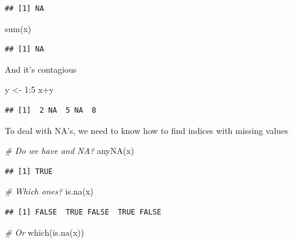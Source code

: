 \documentclass[
]{book}
\newenvironment{Shaded}{\begin{snugshade}}{\end{snugshade}}
\newcommand{\CommentTok}[1]{\textcolor[rgb]{0.56,0.35,0.01}{\textit{#1}}}
\newcommand{\DecValTok}[1]{\textcolor[rgb]{0.00,0.00,0.81}{#1}}
\newcommand{\FunctionTok}[1]{\textcolor[rgb]{0.00,0.00,0.00}{#1}}
\newcommand{\NormalTok}[1]{#1}
\newcommand{\OtherTok}[1]{\textcolor[rgb]{0.56,0.35,0.01}{#1}}
\newcommand{\SpecialCharTok}[1]{\textcolor[rgb]{0.00,0.00,0.00}{#1}}
\theoremstyle{definition}
\theoremstyle{definition}
\theoremstyle{definition}
\theoremstyle{definition}
\theoremstyle{remark}
\begin{document}
\begin{verbatim}
## [1] NA
\end{verbatim}

\begin{Shaded}
\begin{Highlighting}[]
\FunctionTok{sum}\NormalTok{(x)}
\end{Highlighting}
\end{Shaded}

\begin{verbatim}
## [1] NA
\end{verbatim}

And it's contagious

\begin{Shaded}
\begin{Highlighting}[]
\NormalTok{y }\OtherTok{\textless{}{-}} \DecValTok{1}\SpecialCharTok{:}\DecValTok{5}
\NormalTok{x}\SpecialCharTok{+}\NormalTok{y}
\end{Highlighting}
\end{Shaded}

\begin{verbatim}
## [1]  2 NA  5 NA  8
\end{verbatim}

To deal with NA's, we need to know how to find indices with missing values

\begin{Shaded}
\begin{Highlighting}[]
\CommentTok{\# Do we have and NA?}
\FunctionTok{anyNA}\NormalTok{(x)}
\end{Highlighting}
\end{Shaded}

\begin{verbatim}
## [1] TRUE
\end{verbatim}

\begin{Shaded}
\begin{Highlighting}[]
\CommentTok{\# Which ones?}
\FunctionTok{is.na}\NormalTok{(x)}
\end{Highlighting}
\end{Shaded}

\begin{verbatim}
## [1] FALSE  TRUE FALSE  TRUE FALSE
\end{verbatim}

\begin{Shaded}
\begin{Highlighting}[]
\CommentTok{\# Or}
\FunctionTok{which}\NormalTok{(}\FunctionTok{is.na}\NormalTok{(x))}
\end{Highlighting}
\end{Shaded}
\end{document}
